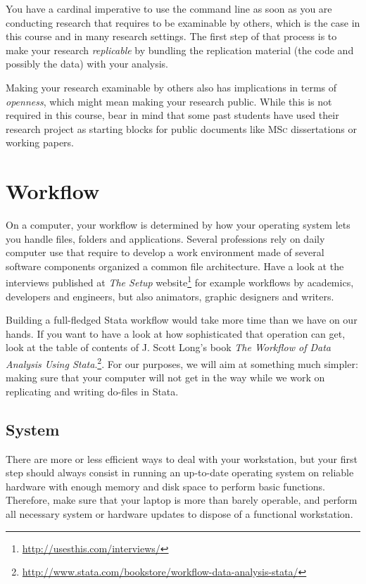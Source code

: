 You have a cardinal imperative to use the command line as soon as you are conducting research that requires to be examinable by others, which is the case in this course and in many research settings. The first step of that process is to make your research \emph{replicable} by bundling the replication material (the code and possibly the data) with your analysis.%

Making your research examinable by others also has implications in terms of \emph{openness}, which might mean making your research public. While this is not required in this course, bear in mind that some past students have used their research project as starting blocks for public documents like \textsc{MSc} dissertations or working papers.%



%
\section{Workflow}%

On a computer, your workflow is determined by how your operating system lets you handle files, folders and applications. Several professions rely on daily computer use that require to develop a work environment made of several software components organized a common file architecture. Have a look at the interviews published at \emph{The Setup} website\footnote{\url{http://usesthis.com/interviews/}} for example workflows by academics, developers and engineers, but also animators, graphic designers and writers.%

Building a full-fledged Stata workflow would take more time than we have on our hands. If you want to have a look at how sophisticated that operation can get, look at the table of contents of J. Scott Long's book \emph{The Workflow of Data Analysis Using Stata}.\footnote{\url{http://www.stata.com/bookstore/workflow-data-analysis-stata/}}. For our purposes, we will aim at something much simpler: making sure that your computer will not get in the way while we work on replicating and writing do-files in Stata.%


%
%
\subsection{System}

There are more or less efficient ways to deal with your workstation, but your first step should always consist in running an up-to-date operating system on reliable hardware with enough memory and disk space to perform basic functions. Therefore, make sure that your laptop is more than barely operable, and perform all necessary system or hardware updates to dispose of a functional workstation.


